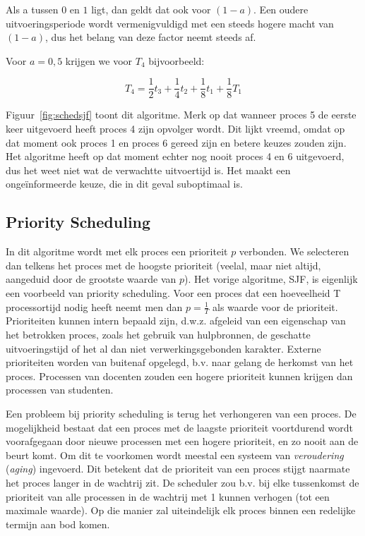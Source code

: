 Als a tussen $0$ en $1$ ligt, dan geldt dat ook voor $(1-a)$. Een
oudere uitvoeringsperiode wordt vermenigvuldigd met een steeds hogere
macht van $(1-a)$, dus het belang van deze factor neemt steeds
af.

Voor $a=0,5$ krijgen we voor $T_4$ bijvoorbeeld:

\begin{displaymath}
T_4 = \frac{1}{2}t_3 + \frac{1}{4}t_2 + \frac{1}{8}t_1 + \frac{1}{8}T_1
\end{displaymath}

Figuur~\ref{fig:schedsjf} toont dit algoritme. Merk op dat wanneer proces 5 de eerste keer uitgevoerd heeft proces 4 zijn opvolger wordt. Dit lijkt vreemd, omdat op dat moment ook proces 1 en proces 6 gereed zijn en betere keuzes zouden zijn. Het algoritme heeft op dat moment echter nog nooit proces 4 en 6 uitgevoerd, dus het weet niet wat de verwachtte uitvoertijd is. Het maakt een onge\"informeerde keuze, die in dit geval suboptimaal is.

\subsection{Priority Scheduling}

In dit algoritme wordt met elk proces een prioriteit $p$
verbonden. We selecteren dan telkens het proces met de hoogste
prioriteit (veelal, maar niet altijd, aangeduid door de grootste
waarde van $p$). Het vorige algoritme, SJF, is eigenlijk een voorbeeld
van priority scheduling. Voor een proces dat een hoeveelheid T processortijd
nodig heeft neemt men dan $p = \frac{1}{T}$ als waarde voor de prioriteit.
Prioriteiten kunnen intern bepaald zijn, d.w.z. afgeleid van een eigenschap van
het betrokken proces, zoals het gebruik van hulpbronnen, de geschatte
uitvoeringstijd of het al dan niet verwerkingsgebonden karakter. Externe
prioriteiten worden van buitenaf opgelegd, b.v. naar gelang de herkomst van het
proces. Processen van docenten zouden een hogere prioriteit kunnen krijgen dan
processen van studenten.

Een probleem bij priority scheduling is terug het verhongeren
van een proces. De mogelijkheid bestaat dat een proces met de
laagste prioriteit voortdurend wordt voorafgegaan door nieuwe
processen met een hogere prioriteit, en zo nooit aan de beurt komt. Om dit te
voorkomen wordt meestal een systeem van \emph{veroudering} (\emph{aging})
ingevoerd. Dit betekent dat de prioriteit van een proces stijgt naarmate het
proces langer in de wachtrij zit. De scheduler zou b.v. bij elke tussenkomst de
prioriteit van alle processen in de wachtrij met 1 kunnen verhogen (tot een
maximale waarde). Op die manier zal uiteindelijk elk proces binnen een redelijke
termijn aan bod komen.


